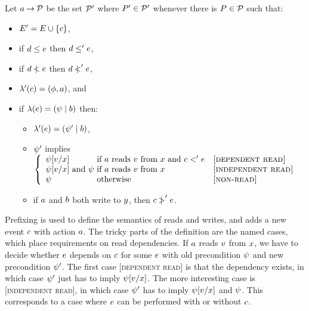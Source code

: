\begin{definition}
  \label{def:prefix}
Let $a \mathbin\rightarrow \mathcal{P}$ be the set $\mathcal{P}'$ where $P'\in\mathcal{P}'$ whenever
there is $P\in\mathcal{P}$ such that:
\begin{itemize}
\item $E' = E \cup \{c\}$,
\item if $d \le e$ then $d \le' e$,
\item if $d \mathrel{\,\mid\!\!\!<} e$ then $d \mathrel{\,\mid\!\!\!<}' e$,
\item $\lambda'(c) = (\phi, a)$, and
\item if $\lambda(e) = (\psi \mid b)$ then:
  \begin{itemize}
  \item $\lambda'(e) = (\psi' \mid b)$,
  \item $\psi'$ implies \(\left\{\begin{array}{l@{~}ll}
    \bForm[\aVal/\aLoc]                     & \mbox{if $\aAct$ reads $\aVal$ from $\aLoc$ and $\cEv<'\aEv$} & \textsc{[dependent read]} \\
    \bForm[\aVal/\aLoc] \text{ and } \bForm & \mbox{if $\aAct$ reads $\aVal$ from $\aLoc$}                  & \textsc{[independent read]} \\
    \bForm                                  & \mbox{otherwise}                                              & \textsc{[non-read]} \\
  \end{array}\right.\)
  \item if $a$ and $b$ both write to $y$,
    then $c \mathrel{\,\mid\!\!\!>}' e$.
  \end{itemize}
\end{itemize}
\end{definition}
Prefixing is used to define the semantics of reads and writes, and
adds a new event $c$ with action $a$. The tricky parts of the
definition are the named cases, which place requirements on read
dependencies.  If $a$ reads $v$ from $x$, we have to
decide whether $e$ depends on $c$ for some $e$ with old
precondition $\psi$ and new precondition $\psi'$. The first case
\textsc{[dependent read]} is that the dependency exists, in which case
$\psi'$ just has to imply $\psi[v/x]$. The more interesting 
case is \textsc{[independent read]}, in which case $\psi'$ has to imply
$\psi[v/x]$ and $\psi$. This corresponds to a case where
$e$ can be performed with or without $c$.
